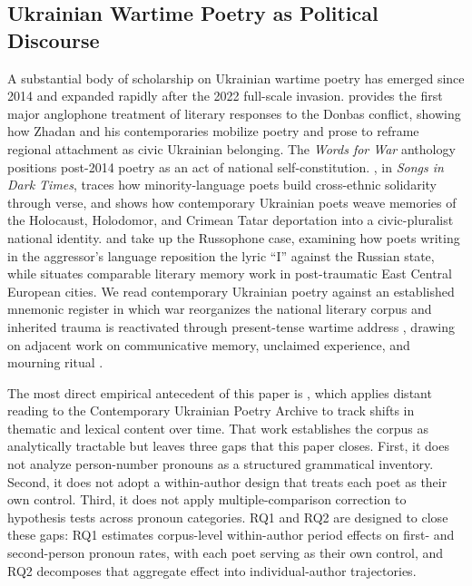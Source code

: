 \documentclass[12pt]{interact}
\theoremstyle{plain}%
\theoremstyle{definition}
\theoremstyle{remark}
\begin{document}
\subsection{Ukrainian Wartime Poetry as Political Discourse}

A substantial body of scholarship on Ukrainian wartime poetry has emerged since 2014 and expanded rapidly after the 2022 full-scale invasion. \citet{ilchuk2017hearing} provides the first major anglophone treatment of literary responses to the Donbas conflict, showing how Zhadan and his contemporaries mobilize poetry and prose to reframe regional attachment as civic Ukrainian belonging. The \emph{Words for War} anthology \citep{maksymchuk2017words} positions post-2014 poetry as an act of national self-constitution. \citet{Glaser2020}, in \emph{Songs in Dark Times}, traces how minority-language poets build cross-ethnic solidarity through verse, and \citet{glaser2023mine} shows how contemporary Ukrainian poets weave memories of the Holocaust, Holodomor, and Crimean Tatar deportation into a civic-pluralist national identity. \citet{kukulin2017the, kukulin2024writing} and \citet{parts2024in} take up the Russophone case, examining how poets writing in the aggressor's language reposition the lyric ``I'' against the Russian state, while \citet{blacker2019memory} situates comparable literary memory work in post-traumatic East Central European cities. We read contemporary Ukrainian poetry against an established mnemonic register in which war reorganizes the national literary corpus and inherited trauma is reactivated through present-tense wartime address \citep{fussell2013the, Hirsch2012the}, drawing on adjacent work on communicative memory, unclaimed experience, and mourning ritual \citep{winter1995sites, caruth1996unclaimed, assmann1995collective}.

The most direct empirical antecedent of this paper is \citet{glaser2024archive}, which applies distant reading to the Contemporary Ukrainian Poetry Archive to track shifts in thematic and lexical content over time. That work establishes the corpus as analytically tractable but leaves three gaps that this paper closes. First, it does not analyze person-number pronouns as a structured grammatical inventory. Second, it does not adopt a within-author design that treats each poet as their own control. Third, it does not apply multiple-comparison correction to hypothesis tests across pronoun categories. RQ1 and RQ2 are designed to close these gaps: RQ1 estimates corpus-level within-author period effects on first- and second-person pronoun rates, with each poet serving as their own control, and RQ2 decomposes that aggregate effect into individual-author trajectories.
\end{document}
